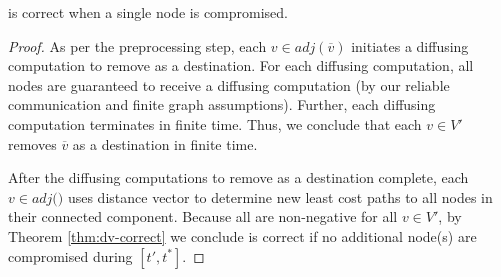 \begin{corollary}
\label{cor:second-correct-single}
\second is correct when a single node is compromised.
\end{corollary}
\begin{proof}
As per the preprocessing step, each $v \in adj(\overline{v})$ initiates a diffusing computation to remove \bad as a destination. For each diffusing computation,
all nodes are guaranteed to receive a diffusing computation (by our reliable communication and finite graph assumptions). Further, each diffusing computation
terminates in finite time.  Thus, we conclude that each $v \in V'$ removes $\overline{v}$ as a destination in finite time.

After the diffusing computations to remove \bad as a destination complete, each 
$v \in adj($\bads$)$ uses distance vector to determine new least cost paths to all nodes in their connected component.
Because all \dmatrixv are non-negative for all $v \in V'$, by Theorem \ref{thm:dv-correct} we conclude \second is correct if no additional node(s) are compromised
during $[t',t^*]$. %
\end{proof}

